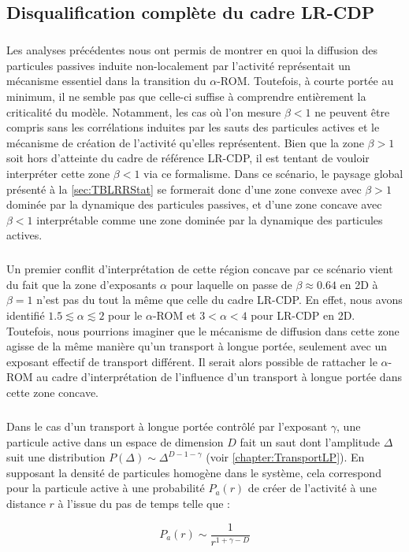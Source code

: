 \subsection{Disqualification complète du cadre LR-CDP}

\subparagraph{}Les analyses précédentes nous ont permis de montrer en quoi la diffusion des particules passives induite non-localement par l'activité représentait un mécanisme essentiel dans la transition du $\alpha$-ROM. Toutefois, à courte portée au minimum, il ne semble pas que celle-ci suffise à comprendre entièrement la criticalité du modèle. Notamment, les cas où l'on mesure $\beta < 1$ ne peuvent être compris sans les corrélations induites par les sauts des particules actives et le mécanisme de création de l'activité qu'elles représentent. Bien que la zone $\beta >1$ soit hors d'atteinte du cadre de référence LR-CDP, il est tentant de vouloir interpréter cette zone $\beta < 1$ via ce formalisme. Dans ce scénario, le paysage global présenté à la \autoref{sec:TBLRRStat} se formerait donc d'une zone convexe avec $\beta>1$ dominée par la dynamique des particules passives, et d'une zone concave avec $\beta<1$ interprétable comme une zone dominée par la dynamique des particules actives.

\subparagraph{}Un premier conflit d'interprétation de cette région concave par ce scénario vient du fait que la zone d'exposants $\alpha$ pour laquelle on passe de $\beta\approx 0.64$ en 2D à $\beta=1$ n'est pas du tout la même que celle du cadre LR-CDP. En effet, nous avons identifié $1.5\lesssim \alpha \lesssim 2$ pour le $\alpha$-ROM et $3<\alpha<4$ pour LR-CDP en 2D. Toutefois, nous pourrions imaginer que le mécanisme de diffusion dans cette zone agisse de la même manière qu'un transport à longue portée, seulement avec un exposant effectif de transport différent. Il serait alors possible de rattacher le $\alpha$-ROM au cadre d'interprétation de l'influence d'un transport à longue portée dans cette zone concave. 

\subparagraph{}Dans le cas d'un transport à longue portée contrôlé par l'exposant $\gamma$, une particule active dans un espace de dimension $D$ fait un saut dont l'amplitude $\Delta$ suit une distribution $P(\Delta)\sim\Delta^{D-1-\gamma}$ (voir \autoref{chapter:TransportLP}). En supposant la densité de particules homogène dans le système, cela correspond pour la particule active à une probabilité $P_a(r)$ de créer de l'activité à une distance $r$ à l’issue du pas de temps telle que :

\begin{equation}
	P_a(r) \sim \frac{1}{r^{1+\gamma-D}}
	\label{eq:sautabsoupas}
\end{equation}

